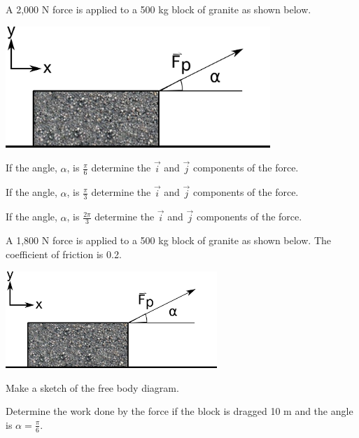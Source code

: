 


\begin{problem}
\item A 2,000 N force is applied to a 500 kg block of granite as shown
  below.

  \includegraphics[width=10cm]{ink/week7/dragBlock}

  \begin{subproblem}
  \item If the angle, $\alpha$, is $\frac{\pi}{6}$ determine the
    $\vec{i}$ and $\vec{j}$ components of the force.
    \vfill
  \item If the angle, $\alpha$, is $\frac{\pi}{3}$ determine the
    $\vec{i}$ and $\vec{j}$ components of the force.
    \vfill
  \item If the angle, $\alpha$, is $\frac{2\pi}{3}$ determine the
    $\vec{i}$ and $\vec{j}$ components of the force.
    \vfill
  \end{subproblem}

  \clearpage

\item A 1,800 N force is applied to a 500 kg block of granite as
  shown below. The coefficient of friction is 0.2.

  \includegraphics[width=8cm]{ink/week7/dragBlock}

  \begin{subproblem}
    \item Make a sketch of the free body diagram.
      \vspace{6em}
    \item Determine the work done by the force if the block is dragged
      10 m and the angle is $\alpha=\frac{\pi}{6}$.


\end{subproblem}
\end{problem}
